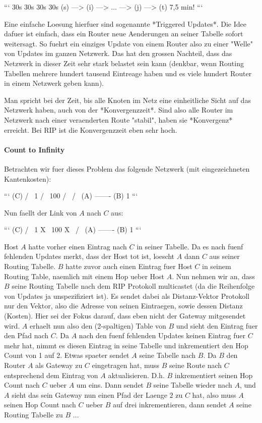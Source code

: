 ```
    30s      30s      30s      30s
(s) ---> (i) ---> ... ---> (j) ---> (t) 7,5 min!
```

Eine einfache Loesung hierfuer sind sogenannte *Triggered Updates*. Die Idee
dafuer ist einfach, dass ein Router neue Aenderungen an seiner Tabelle sofort
weitersagt. So fuehrt ein einziges Update von einem Router also zu einer "Welle"
von Updates im ganzen Netzwerk. Das hat den grossen Nachteil, dass das Netzwerk
in dieser Zeit sehr stark belastet sein kann (denkbar, wenn Routing Tabellen
mehrere hundert tausend Eintreage haben und es viele hundert Router in einem
Netzwerk geben kann).

Man spricht bei der Zeit, bis alle Knoten im Netz eine einheitliche Sicht auf
das Netzwerk haben, auch von der *Konvergenzzeit*. Sind also alle Router im
Netzwerk nach einer veraenderten Route "stabil", haben sie *Konvergenz*
erreicht. Bei RIP ist die Konvergenzzeit eben sehr hoch.

\paragraph{Count to Infinity} 

Betrachten wir fuer dieses Problem das folgende Netzwerk (mit eingezeichneten
Kantenkosten):

```
      (C)
     /   \
  1 /     \ 100
   /       \
  /         \
(A) ------- (B)
       1
```

Nun faellt der Link von $A$ nach $C$ aus:

```
      (C)
     /   \
  1 X     \ 100
   X       \
  /         \
(A) ------- (B)
       1
```

Host $A$ hatte vorher einen Eintrag nach $C$ in seiner Tabelle. Da es nach fuenf
fehlenden Updates merkt, dass der Host tot ist, loescht $A$ dann $C$ aus seiner
Routing Tabelle. $B$ hatte zuvor auch einen Eintrag fuer Host $C$ in seinem
Routing Table, naemlich mit einem Hop ueber Host $A$. Nun nehmen wir an, dass
$B$ seine Routing Tabelle nach dem RIP Protokoll multicastet (da die Reihenfolge
von Updates ja unspezifiziert ist). Es sendet dabei als Distanz-Vektor Protokoll
nur den Vektor, also die Adresse von seinen Eintraegen, sowie dessen Distanz
(Kosten). Hier sei der Fokus darauf, dass eben nicht der Gateway mitgesendet
wird. $A$ erhaelt nun also den (2-spaltigen) Table von $B$ und sieht den Eintrag
fuer den Pfad nach $C$. Da $A$ nach den fuenf fehlenden Updates keinen Eintrag
fuer $C$ mehr hat, nimmt es diesen Eintrag in seine Tabelle und inkrementiert
den Hop Count von 1 auf 2. Etwas spaeter sendet $A$ seine Tabelle nach $B$. Da
$B$ den Router $A$ als Gateway zu $C$ eingetragen hat, muss $B$ seine Route nach
$C$ entsprechend dem Eintrag von $A$ aktualisieren. D.h. $B$ inkrementiert
seinen Hop Count nach $C$ ueber $A$ um eins. Dann sendet $B$ seine Tabelle
wieder nach $A$, und $A$ sieht das sein Gateway nun einen Pfad der Laenge $2$ zu
$C$ hat, also muss $A$ seinen Hop Count nach $C$ ueber $B$ auf drei
inkrementieren, dann sendet $A$ seine Routing Tabelle zu $B$ ...

